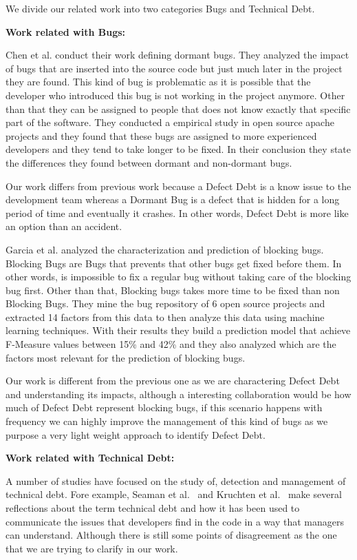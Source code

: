 We divide our related work into two categories Bugs and Technical Debt.

\textbf{Work related with Bugs:}

Chen et al. \cite{Chen2014MSR} conduct their work defining dormant bugs. They analyzed the impact of bugs that are inserted into the source code but just much later in the project they are found. This kind of bug is problematic as it is possible that the developer who introduced this bug is not working in the project anymore. Other than that they can be assigned to people that does not know exactly that specific part of the software. They conducted a empirical study in open source apache projects and they found that these bugs are assigned to more experienced developers and they tend to take longer to be fixed. In their conclusion they state the differences they found between dormant and non-dormant bugs.

Our work differs from previous work because a Defect Debt is a know issue to the development team whereas a Dormant Bug is a defect that is hidden for a long period of time and eventually it crashes. In other words, Defect Debt is more like an option than an accident.

Garcia et al. \cite{garcia2014MSR} analyzed the characterization and prediction of blocking bugs. Blocking Bugs are Bugs that prevents that other bugs get fixed before them. In other words, is impossible to fix a regular bug without taking care of the blocking bug first. Other than that, Blocking bugs takes more time to be fixed than non Blocking Bugs. They mine the bug repository of 6 open source projects and extracted 14 factors from this data to then analyze this data using machine learning techniques. With their results they build a prediction model that achieve F-Measure values between 15\% and 42\% and they also analyzed which are the factors most relevant for the prediction of blocking bugs.

Our work is different from the previous one as we are charactering Defect Debt and understanding its impacts, although a interesting collaboration would be how much of Defect Debt represent blocking bugs, if this scenario happens with frequency we can highly  improve the management of this kind of bugs as we purpose a very light weight approach to identify Defect Debt.

\textbf{Work related with Technical Debt:}

A number of studies have focused on the study of, detection and management of technical debt. Fore example, Seaman et al.~\cite{Seaman201125} and Kruchten et al.~\cite{Kruchten2013GSOFT}  make several reflections about the term technical debt and how it has been used to communicate the issues that developers find in the code in a way that managers can understand. Although there is still some points of disagreement as the one that we are trying to clarify in our work.